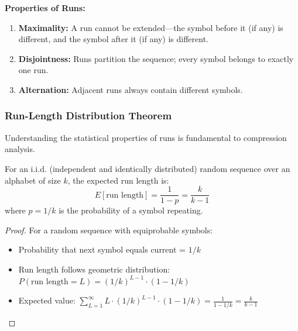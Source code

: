 \textbf{Properties of Runs:}
\begin{enumerate}
    \item \textbf{Maximality:} A run cannot be extended—the symbol before it (if any) is different, and the symbol after it (if any) is different.
    \item \textbf{Disjointness:} Runs partition the sequence; every symbol belongs to exactly one run.
    \item \textbf{Alternation:} Adjacent runs always contain different symbols.
\end{enumerate}

\subsubsection{Run-Length Distribution Theorem}

Understanding the statistical properties of runs is fundamental to compression analysis.

\begin{theorem}
For an i.i.d. (independent and identically distributed) random sequence over an alphabet of size $k$, the expected run length is:
\[
E[\text{run length}] = \frac{1}{1-p} = \frac{k}{k-1}
\]
where $p = 1/k$ is the probability of a symbol repeating.
\end{theorem}

\begin{proof}
For a random sequence with equiprobable symbols:
\begin{itemize}
    \item Probability that next symbol equals current = $1/k$
    \item Run length follows geometric distribution: $P(\text{run length} = L) = (1/k)^{L-1} \cdot (1 - 1/k)$
    \item Expected value: $\sum_{L=1}^{\infty} L \cdot (1/k)^{L-1} \cdot (1 - 1/k) = \frac{1}{1-1/k} = \frac{k}{k-1}$
\end{itemize}
\end{proof}

